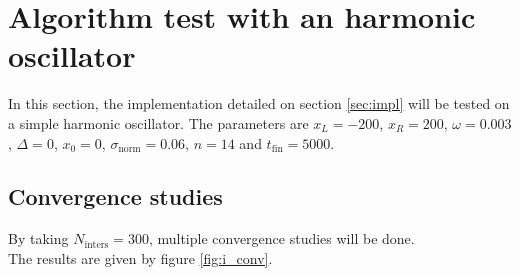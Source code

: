 \documentclass[a4paper,12pt,twoside]{article}
\begin{document}
\section{Algorithm test with an harmonic oscillator}\label{sec:har_osc} %
  In this section, the implementation detailed on section \ref{sec:impl} will be tested on a simple harmonic oscillator.
  The parameters are $x_L=\num{-200}$, $x_R=\num{200}$, $\omega = \num{0.003}$, $\Delta = 0$, $x_0 = 0$, $\sigma_\text{norm} = 0.06$, $n=14$ and $t_\text{fin} = 5000$. %

  \subsection{Convergence studies}
    By taking $N_\text{inters} = 300$, multiple convergence studies will be done.\\

    The results are given by figure \ref{fig:i_conv}.
\end{document}
